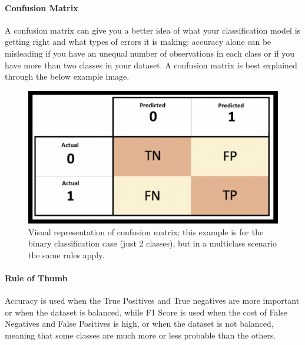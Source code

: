 \paragraph{Confusion Matrix} A confusion matrix can give you a better idea of what your classification model is getting right and what types of errors it is making: accuracy alone can be misleading if you have an unequal number of observations in each class or if you have more than two classes in your dataset.
A confusion matrix is best explained through the below example image.

\begin{figure}[h]
    \centering
    \includegraphics[scale=0.35]{images/eval-metrics/conf-matrix.png}
    \caption{Visual representation of confusion matrix; this example is for the binary classification case (just 2 classes), but in a multiclass scenario the same rules apply.}
    \label{fig:eval_metrics_conf_matrix}
\end{figure}


\paragraph{Rule of Thumb} Accuracy is used when the True Positives and True negatives are more important or when the dataset is balanced, while F1 Score is used when the cost of False Negatives and False Positives is high, or when the dataset is not balanced, meaning that some classes are much more or less probable than the others.
